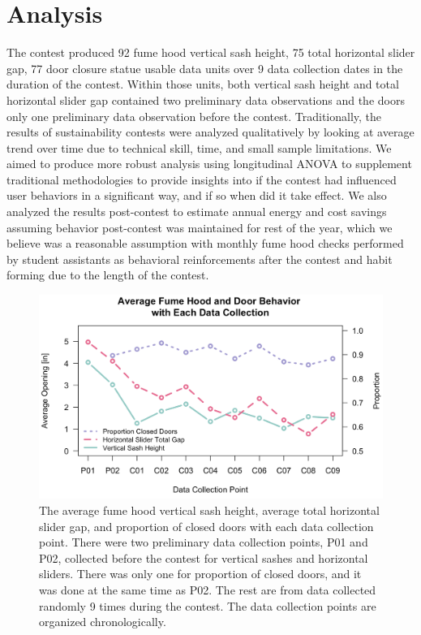 \documentclass[12pt, twocolumn]{article}
\begin{document}
\section*{Analysis}\label{Sec:Analysis}
The contest produced 92 fume hood vertical sash height, 75 total horizontal slider gap, 77 door closure statue usable data units over 9 data collection dates in the duration of the contest. Within those units, both vertical sash height and total horizontal slider gap contained two preliminary data observations and the doors only one preliminary data observation before the contest. Traditionally, the results of sustainability contests were analyzed qualitatively by looking at average trend over time due to technical skill, time, and small sample limitations. We aimed to produce more robust analysis using longitudinal ANOVA to supplement traditional methodologies to provide insights into if the contest had influenced user behaviors in a significant way, and if so when did it take effect. We also analyzed the results post-contest to estimate annual energy and cost savings assuming behavior post-contest was maintained for rest of the year, which we believe was a reasonable assumption with monthly fume hood checks performed by student assistants as behavioral reinforcements after the contest and habit forming due to the length of the contest. 
\begin{figure}[ht]	
	\centering
	\includegraphics[width=1\textwidth]{Images/FumeHoodAnalysis_AvgTrendAndProportions.png}
	\captionsetup{width=.9\linewidth}
	\caption{The average fume hood vertical sash height, average total horizontal slider gap, and proportion of closed doors with each data collection point. There were two preliminary data collection points, P01 and P02, collected before the contest for vertical sashes and horizontal sliders. There was only one for proportion of closed doors, and it was done at the same time as P02. The rest are from data collected randomly 9 times during the contest. The data collection points are organized chronologically. }
	\label{Fig:AverageTrendsSashSliderDoors}
\end{figure}
\end{document}
